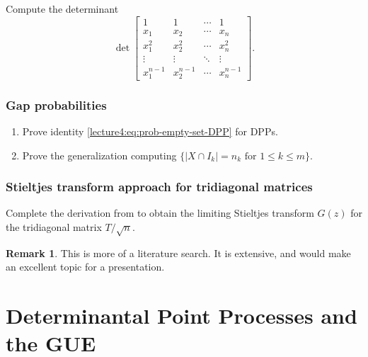 \documentclass[letterpaper,11pt,oneside,reqno]{book}
\numberwithin{equation}{chapter}  %
\theoremstyle{definition}
\newtheorem{remark}[proposition]{Remark}
\begin{document}
Compute the determinant
\begin{equation*}
	\det\left[
		\begin{array}{cccc}
			1 & 1 & \cdots & 1 \\
			x_1 & x_2 & \cdots & x_n \\
			x_1^2 & x_2^2 & \cdots & x_n^2 \\
			\vdots & \vdots & \ddots & \vdots \\
			x_1^{n-1} & x_2^{n-1} & \cdots & x_n^{n-1}
		\end{array}
	\right].
\end{equation*}

\subsection{Gap probabilities}

\begin{enumerate}
	\item
Prove identity
\eqref{lecture4:eq:prob-empty-set-DPP} for DPPs.
\item Prove the generalization computing
	\(\{|X\cap I_k|=n_k\text{ for }1\le k\le m\}\).
\end{enumerate}


\subsection{Stieltjes transform approach for tridiagonal matrices}
\label{lecture4:prob:resolvent-diff-eq}

Complete the derivation from  to obtain the limiting Stieltjes transform $G(z)$ for the tridiagonal matrix $T/\sqrt{n}$.

\begin{remark}
	This is more of a literature search. It is extensive, and
	would make an excellent topic for a presentation.
\end{remark}












\chapter{Determinantal Point Processes and the GUE}
\label{chap:lecture5}
\end{document}
